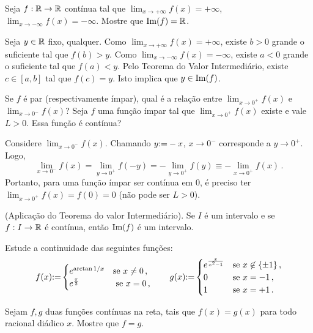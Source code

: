 \begin{exo}
Seja $f:\mathbb{R}\to \mathbb{R}$ contínua tal que $\lim_{x\to +\infty}f(x)=+\infty$,
$\lim_{x\to -\infty}f(x)=-\infty$. Mostre que $\operatorname{Im}(f)=\mathbb{R}$.
\begin{sol}
Seja $y\in \mathbb{R}$ fixo, qualquer. Como $\lim_{x\to
+\infty}f(x)=+\infty$, existe $b>0$ grande o suficiente tal que
$f(b)>y$. 
Como $\lim_{x\to -\infty}f(x)=-\infty$, existe $a<0$ grande o
suficiente tal que $f(a)<y$. 
Pelo Teorema do Valor Intermediário, existe $c\in [a,b]$ tal que
$f(c)=y$. Isto implica que $y\in \operatorname{Im}(f)$.
\end{sol}
\end{exo}


\begin{exo}
Se $f$ é par (respectivamente ímpar), qual é a relação entre 
$\lim_{x\to 0^+}f(x)$ e $\lim_{x\to 0^-}f(x)$?
Seja $f$ uma função ímpar tal que $\lim_{x\to 0^+}f(x)$ existe e vale $L>0$.
Essa função é contínua?
\begin{sol}
Considere $\lim_{x\to 0^-}f(x)$. Chamando $y{:=} -x$, $x\to 0^-$ corresponde
a $y\to 0^+$.
Logo, $$\lim_{x\to 0^-}f(x)=\lim_{y\to 0^+}f(-y)=-\lim_{y\to 0^+}f(y)\equiv-
\lim_{x\to 0^+}f(x)\,.$$
Portanto, para uma função ímpar ser contínua em $0$, é preciso ter 
$\lim_{x\to 0^+}f(x)=f(0)=0$ (não pode ser $L>0$).
\end{sol}
\end{exo}

\begin{exo} (Aplicação do Teorema do valor Intermediário).
Se $I$ é um intervalo e se $f:I\to \mathbb{R}$ é contínua, então
$\operatorname{Im}(f)$ é um
intervalo.
\end{exo}



\begin{exo}
Estude a continuidade das seguintes funções:
$$
f(x){:=} 
\begin{cases}
 e^{\arctan 1/x}&\text{se }x\neq 0\,,\\
e^{\frac{\pi}{2}}&\text{ se }x=0\,,
\end{cases}
\quad\quad
g(x){:=} 
\begin{cases}
 e^{\frac{x}{x^2-1}}&\text{se }x\not\in \{\pm 1\}\,,\\
0&\text{se }x=-1\,,\\
1&\text{se }x=+1\,.
\end{cases}
$$
\end{exo}

\begin{exo}
Sejam $f,g$ duas funções contínuas na reta, tais que $f(x)=g(x)$ para todo
racional diádico $x$. Mostre que $f=g$.
\end{exo}




